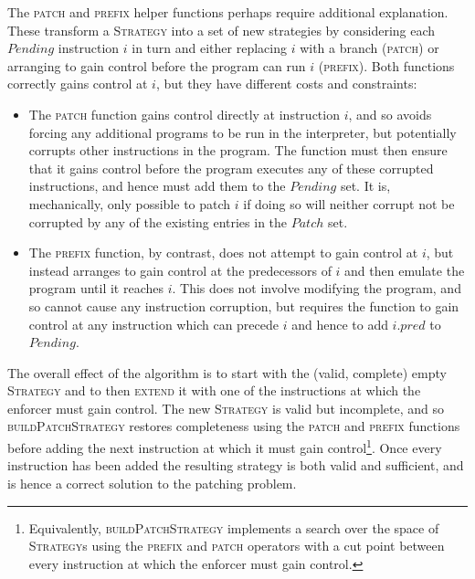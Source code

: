 The \textsc{patch} and \textsc{prefix} helper functions perhaps
require additional explanation.  These transform a \textsc{Strategy}
into a set of new strategies by considering each $\mathit{Pending}$
instruction $i$ in turn and either replacing $i$ with a branch
(\textsc{patch}) or arranging to gain control before the program can
run $i$ (\textsc{prefix}).  Both functions correctly gains control at
$i$, but they have different costs and constraints:
\begin{itemize}
\item The \textsc{patch} function gains control directly at
  instruction $i$, and so avoids forcing any additional programs to be
  run in the interpreter, but potentially corrupts other instructions
  in the program.  The function must then ensure that it gains control
  before the program executes any of these corrupted instructions, and
  hence must add them to the $\mathit{Pending}$ set.  It is,
  mechanically, only possible to patch $i$ if doing so will neither
  corrupt not be corrupted by any of the existing entries in the
  $\mathit{Patch}$ set.
\item The \textsc{prefix} function, by contrast, does not attempt to
  gain control at $i$, but instead arranges to gain control at the
  predecessors of $i$ and then emulate the program until it reaches
  $i$.  This does not involve modifying the program, and so cannot
  cause any instruction corruption, but requires the function to gain
  control at any instruction which can precede $i$ and hence to add
  $i.\mathit{pred}$ to $\mathit{Pending}$.
\end{itemize}
The overall effect of the algorithm is to start with the (valid,
complete) empty \textsc{Strategy} and to then \textsc{extend} it with
one of the instructions at which the enforcer must gain control.  The
new \textsc{Strategy} is valid but incomplete, and so
\textsc{buildPatchStrategy} restores completeness using the
\textsc{patch} and \textsc{prefix} functions before adding the next
instruction at which it must gain control\footnote{Equivalently,
  \textsc{buildPatchStrategy} implements a search over the space of
  \textsc{Strategy}s using the \textsc{prefix} and \textsc{patch}
  operators with a cut point between every instruction at which the
  enforcer must gain control.}.  Once every instruction has been added
the resulting strategy is both valid and sufficient, and is hence a
correct solution to the patching problem.
